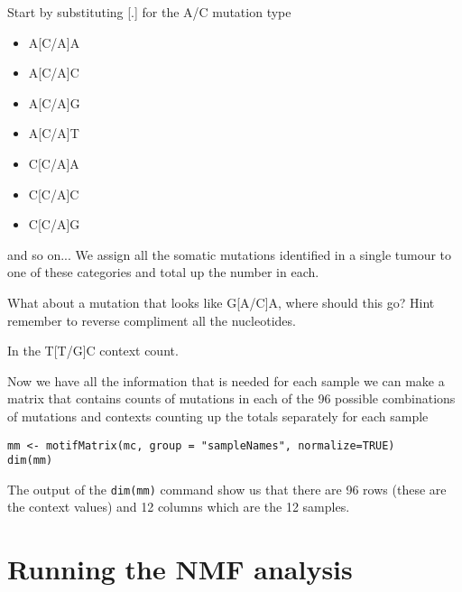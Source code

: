 \begin{information}
\vspace{4 mm}
Start by substituting [.] for the A/C mutation type
\begin{itemize}
\item A[C/A]A
\item A[C/A]C	    
\item A[C/A]G	    
\item A[C/A]T
\item C[C/A]A
\item C[C/A]C
\item C[C/A]G
\end{itemize}
and so on...
\vspace{4 mm}
We assign all the somatic mutations identified in a single tumour to one of these categories and total up the number in each.
\end{information}

\begin{questions}
What about a mutation that looks like G[A/C]A, where should this go?
Hint remember to reverse compliment all the nucleotides.
\end{questions}

\begin{answer}
    In the T[T/G]C context count.
\end{answer}

\begin{steps}
Now we have all the information that is needed for each sample we can make a matrix
that contains counts of mutations in each of the 96 possible combinations of
mutations and contexts counting up the totals separately for each sample

\begin{lstlisting}
mm <- motifMatrix(mc, group = "sampleNames", normalize=TRUE)
dim(mm)
\end{lstlisting}
\end{steps}

The output of the \texttt{dim(mm)} command show us that there are 96 rows (these are the context values)
and 12 columns which are the 12 samples.


\section{Running the NMF analysis}

